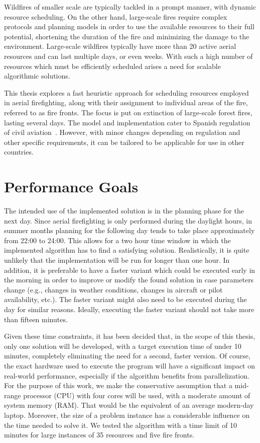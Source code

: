 Wildfires of smaller scale are typically tackled in a prompt manner, with dynamic resource scheduling.
On the other hand, large-scale fires require complex protocols and planning models in order to use the available resources to their full potential, shortening the duration of the fire and minimizing the damage to the environment.
Large-scale wildfires typically have more than 20 active aerial resources and can last multiple days, or even weeks.
With such a high number of resources which must be efficiently scheduled arises a need for scalable algorithmic solutions.

This thesis explores a fast heuristic approach for scheduling resources employed in aerial firefighting, along with their assignment to individual areas of the fire, referred to as fire fronts.
The focus is put on extinction of large-scale forest fires, lasting several days.
The model and implementation cater to Spanish regulation of civil aviation~\cite{Spain/AnnexCircular}.
However, with minor changes depending on regulation and other specific requirements, it can be tailored to be applicable for use in other countries.


\section{Performance Goals}

The intended use of the implemented solution is in the planning phase for the next day.
Since aerial firefighting is only performed during the daylight hours, in summer months planning for the following day tends to take place approximately from 22:00 to 24:00.
This allows for a two hour time window in which the implemented algorithm has to find a satisfying solution.
Realistically, it is quite unlikely that the implementation will be run for longer than one hour.
In addition, it is preferable to have a faster variant which could be executed early in the morning in order to improve or modify the found solution in case parameters change (e.g., changes in weather conditions, changes in aircraft or pilot availability, etc.).
The faster variant might also need to be executed during the day for similar reasons.
Ideally, executing the faster variant should not take more than fifteen minutes.

Given these time constraints, it has been decided that, in the scope of this thesis, only one solution will be developed, with a target execution time of under 10 minutes, completely eliminating the need for a second, faster version.
Of course, the exact hardware used to execute the program will have a significant impact on real-world performance, especially if the algorithm benefits from parallelization.
For the purpose of this work, we make the conservative assumption that a mid-range processor (CPU) with four cores will be used, with a moderate amount of system memory (RAM).
That would be the equivalent of an average modern-day laptop.
Moreover, the size of a problem instance has a considerable influence on the time needed to solve it.
We tested the algorithm with a time limit of 10 minutes for large instances of 35 resources and five fire fronts.


